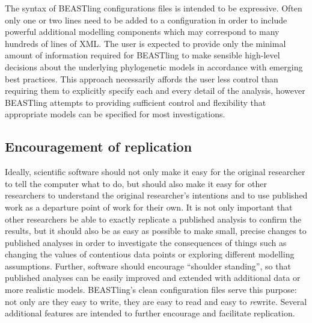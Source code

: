 \documentclass[twocolumn,10pt]{scrartcl}
\begin{document}
The syntax of BEASTling configurations files is intended to be expressive.  Often only one or two lines need to be added to a configuration in order to include powerful additional modelling components which may correspond to many hundreds of lines of XML.  The user is expected to provide only the minimal amount of information required for BEASTling to make sensible high-level decisions about the underlying phylogenetic models in accordance with emerging best practices.  This approach necessarily affords the user less control than requiring them to explicitly specify each and every detail of the analysis, however BEASTling attempts to providing sufficient control and flexibility that appropriate models can be specified for most investigations.


\subsection{Encouragement of replication}

Ideally, scientific software should not only make it easy for the original researcher to tell the computer what to do, but should also make it easy for other researchers to understand the original researcher's intentions and to use published work as a departure point of work for their own.  It is not only important that other researchers be able to exactly replicate a published analysis to confirm the results, but it should also be as easy as possible to make small, precise changes to published analyses in order to investigate the consequences of things such as changing the values of contentious data points or exploring different modelling assumptions.  Further, software should encourage ``shoulder standing'', so that published analyses can be easily improved and extended with additional data or more realistic models.  BEASTling's clean configuration files serve this purpose: not only are they easy to write, they are easy to read and easy to \emph{re}write.  Several additional features are intended to further encourage and facilitate replication.
\end{document}
